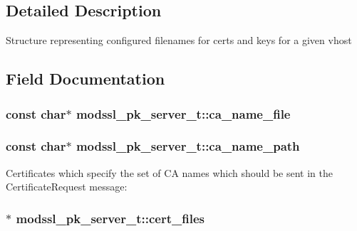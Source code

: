 \subsection{Detailed Description}
Structure representing configured filenames for certs and keys for a given vhost 

\subsection{Field Documentation}
\subsubsection[{\texorpdfstring{ca\+\_\+name\+\_\+file}{ca_name_file}}]{\setlength{\rightskip}{0pt plus 5cm}const char$\ast$ modssl\+\_\+pk\+\_\+server\+\_\+t\+::ca\+\_\+name\+\_\+file}\hypertarget{structmodssl__pk__server__t_ad6f1c8953aab63409070ced65e2e8f73}{}\label{structmodssl__pk__server__t_ad6f1c8953aab63409070ced65e2e8f73}
\subsubsection[{\texorpdfstring{ca\+\_\+name\+\_\+path}{ca_name_path}}]{\setlength{\rightskip}{0pt plus 5cm}const char$\ast$ modssl\+\_\+pk\+\_\+server\+\_\+t\+::ca\+\_\+name\+\_\+path}\hypertarget{structmodssl__pk__server__t_a9c9ec7bc40789faf515444c23df3fe38}{}\label{structmodssl__pk__server__t_a9c9ec7bc40789faf515444c23df3fe38}
Certificates which specify the set of CA names which should be sent in the Certificate\+Request message\+: 
\subsubsection[{\texorpdfstring{cert\+\_\+files}{cert_files}}]{$\ast$ modssl\+\_\+pk\+\_\+server\+\_\+t\+::cert\+\_\+files}\hypertarget{structmodssl__pk__server__t_a8dd3a812b6a91f1d95a7958a8674a72d}{}\label{structmodssl__pk__server__t_a8dd3a812b6a91f1d95a7958a8674a72d}
